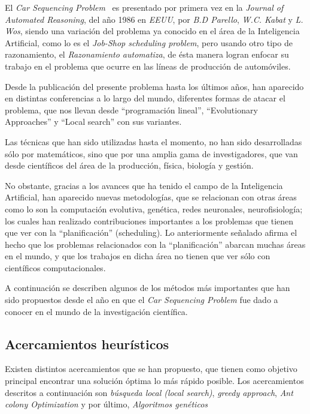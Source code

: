 

El \emph{Car Sequencing Problem}~\cite{parello} es presentado por primera vez en la \emph{Journal of Automated Reasoning},
del año 1986 en \emph{EEUU}, por \emph{B.D Parello}, \emph{W.C. Kabat} y \emph{L. Wos}, siendo una variación
del problema ya conocido en el área de la Inteligencia Artificial, como lo es el \emph{Job-Shop scheduling problem},
pero usando otro tipo de razonamiento, el \emph{Razonamiento automatiza}, de ésta manera logran enfocar su trabajo
en el problema que ocurre en las líneas de producción de automóviles.

Desde la publicación del presente problema hasta los últimos años, han aparecido en distintas conferencias a lo largo
del mundo, diferentes formas de atacar el problema, que nos llevan desde  ``programación lineal'', ``Evolutionary Approaches''
y ``Local search'' con sus variantes.

Las técnicas que han sido utilizadas hasta el momento, no han sido desarrolladas sólo por matemáticos, sino que por una amplia
gama de investigadores, que van desde científicos del área de la producción, física, biología y gestión.

No obstante, gracias a los avances que ha tenido el campo de la Inteligencia Artificial, han aparecido nuevas metodologías,
que se relacionan con otras áreas como lo son la computación evolutiva, genética,  redes neuronales, neurofisiología;
los cuales han realizado contribuciones importantes a los problemas que tienen que ver con la ``planificación'' (scheduling).
Lo anteriormente señalado afirma el hecho que los problemas relacionados con la ``planificación'' abarcan muchas áreas en el mundo,
y que los trabajos en dicha área no tienen que ver sólo con científicos computacionales.

A continuación se describen algunos de los métodos más importantes que han sido propuestos desde el año
en que el \emph{Car Sequencing Problem} fue dado a conocer en el mundo de la investigación científica.


\subsection{Acercamientos heurísticos}
Existen distintos acercamientos que se han propuesto, que tienen como objetivo principal
encontrar una solución óptima lo más rápido posible.
Los acercamientos descritos a continuación son \emph{búsqueda local (local search)},
\emph{greedy approach}, \emph{Ant colony Optimization} y por último, \emph{Algoritmos genéticos}

